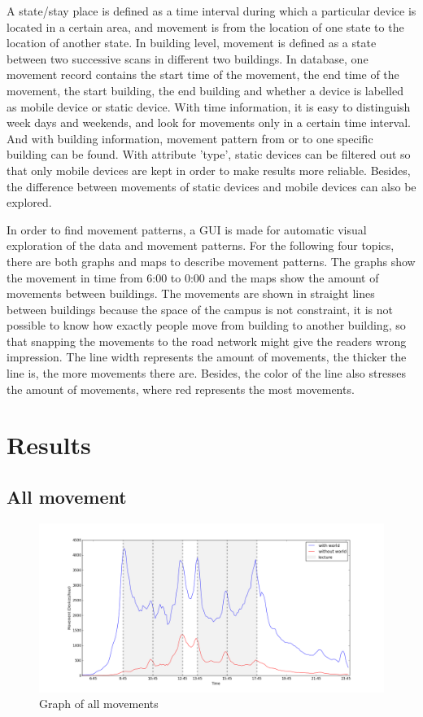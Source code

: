 A state/stay place is defined as a time interval during which a particular device is located in a certain area, and movement is from the location of one state to the location of another state. In building level, movement is defined as a state between two successive scans in different two buildings.
In database, one movement record contains the start time of the movement, the end time of the movement, the start building, the end building and whether a device is labelled as mobile device or static device. With time information, it is easy to distinguish week days and weekends, and look for movements only in a certain time interval. And with building information, movement pattern from or to one specific building can be found. With attribute 'type', static devices can be filtered out so that only mobile devices are kept in order to make results more reliable. Besides, the difference between movements of static devices and mobile devices can also be explored.

In order to find movement patterns, a GUI is made for automatic visual exploration of the data and movement patterns. For the following four topics, there are both graphs and maps to describe movement patterns. The graphs show the movement in time from 6:00 to 0:00 and the maps show the amount of movements between buildings. The movements are shown in straight lines between buildings because the space of the campus is not constraint, it is not possible to know how exactly people move from building to another building, so that snapping the movements to the road network might give the readers wrong impression. The line width represents the amount of movements, the thicker the line is, the more movements there are. Besides, the color of the line also stresses the amount of movements, where red represents the most movements.

\section{Results}\label{chapter9results}
\subsection{All movement}\label{chapter9Allmovement}

\begin{figure}[H]
	\centering
	\includegraphics[scale=0.3]{building_all_graph.png}
	\captionsetup{justification=centering}
	\caption{Graph of all movements}
	\label{building_all_graph}
\end{figure}

